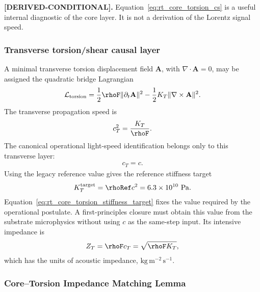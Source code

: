 \textbf{[DERIVED-CONDITIONAL].}
Equation~\eqref{eq:rt_core_torsion_cs} is a useful internal diagnostic of the core layer. It is not a derivation of the Lorentz signal speed.

\subsubsection{Transverse torsion/shear causal layer}

A minimal transverse torsion displacement field \(\mathbf A\), with \(\nabla\cdot\mathbf A=0\), may be assigned the quadratic bridge Lagrangian
\begin{align}
    \mathcal L_{\rm torsion}
    =
    \frac12\rhoF\lVert\partial_t\mathbf A\rVert^2
    -
    \frac12K_T\lVert\nabla\times\mathbf A\rVert^2 .
\end{align}
The transverse propagation speed is
\begin{align}
    c_T^2=\frac{K_T}{\rhoF}.
\end{align}
The canonical operational light-speed identification belongs only to this
transverse layer:
\begin{align}
    c_T=c.
    \label{eq:rt_core_torsion_operational_c}
\end{align}
Using the legacy reference value gives the reference stiffness
target
\begin{align}
    K_T^{\mathrm{target}}
    =
    \rhoRef c^2
    =
    6.3\times10^{10}\ \mathrm{Pa}.
    \label{eq:rt_core_torsion_stiffness_target}
\end{align}
Equation~\eqref{eq:rt_core_torsion_stiffness_target} fixes the value required by
the operational postulate. A first-principles closure must obtain this value from
the substrate microphysics without using \(c\) as the same-step input.
Its intensive impedance is
\begin{align}
    Z_T=\rhoF c_T=\sqrt{\rhoF K_T},
\end{align}
which has the units of acoustic impedance, \(\mathrm{kg\,m^{-2}\,s^{-1}}\).

\subsubsection{Core--Torsion Impedance Matching Lemma}

